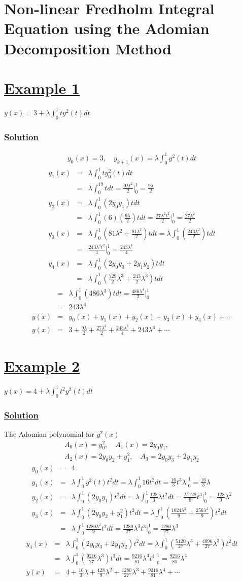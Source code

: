 \documentclass[11pt]{report}
\newcommand{\ubt}[1]{\textbf{\underline{#1}}}
\newcommand{\sps}{\\[0.2cm]}
\newcommand{\dsp}{\displaystyle}
\newcommand{\example}[1]{\section*{\ubt{Example #1}}}
\newcommand{\solution}{\subsubsection{\ubt{Solution}}}
\begin{document}
	\section{Non-linear Fredholm Integral Equation using the Adomian Decomposition Method}
	\example{1}
	$\dsp y(x) = 3 + \lambda\int_0^1 ty^2(t)dt$
	\solution
	\begin{eqnarray*}
		y_0(x) = 3,\quad y_{k+1}(x) = \lambda\int_0^1 y^2(t)dt
	\end{eqnarray*}
	\begin{eqnarray*}
		y_1(x)&=& \lambda\int_0^1 ty_0^2(t)dt\sps
		&=& \lambda\int_0^19t dt = \frac{9\lambda t^2}{2}\Bigg|_0^1 = \frac{9\lambda}{2}\sps
		y_2(x) &=& \lambda\int_0^1(2y_0y_1)tdt\sps
		&=& \lambda\int_0^1 (6)\left(\frac{9\lambda}{2}\right)tdt = \frac{27\lambda^2 t^2}{2}\Bigg|_0^1 = \frac{27\lambda^2}{2} \sps
		y_3(x) &=& \lambda\int_0^1\left(81\lambda^2 + \frac{81\lambda^2}{2}\right)t dt = \lambda\int_0^1\left(\frac{243\lambda^2}{2}\right)t dt\sps
		&=& \frac{243\lambda^3t^2}{4}\Bigg|_0^1 = \frac{243\lambda^3}{4}\sps
		y_4(x) &=& \lambda\int_0^1 (2y_0y_3 + 2y_1y_2)t dt\sps
		&=& \lambda\int_0^1\left(\frac{729}{2}\lambda^3 + \frac{243}{2}\lambda^3\right)t dt
	\end{eqnarray*}
	\begin{eqnarray*}
		&=&\lambda\int_0^1(486\lambda^3)t dt = \frac{486\lambda^4}{2}\Bigg|_0^1\sps
		&=& 243\lambda^4\sps
		y(x) &=& y_0(x) + y_1(x) + y_2(x) + y_3(x) + y_4(x) + \cdots\sps
		y(x) &=& 3 + \frac{9\lambda}{2} + \frac{27\lambda^2}{2} + \frac{243\lambda^3}{4} + 243\lambda^4 + \cdots
	\end{eqnarray*}

	\example{2}
	$\dsp y(x) = 4 + \lambda\int_0^1 t^2y^2(t)dt$
	\solution
	The Adomian polynomial for $y^2(x)$
	\begin{gather*}
		A_0(x) = y_0^2,\quad A_1(x)=2y_0y_1,\sps
		 A_2(x) =2y_0y_2 + y_1^2,\quad
		A_3 = 2y_0y_3 + 2y_1y_2
	\end{gather*}
	\begin{eqnarray*}
		y_0(x) &=& 4\sps
		y_1(x) &=& \lambda\int_0^1y^2(t)t^2dt = \lambda\int_0^1 16t^2 dt = \frac{16}{3}t^3\lambda\Bigg|_0^1 = \frac{16}{3}\lambda\sps
		y_2(x) &=& \lambda\int_0^1(2y_0y_1)t^2 dt = \lambda\int_0^1 \frac{128}{3}\lambda t^2 dt = \frac{\lambda^2 128}{9}t^3\Bigg|_0^1 = \frac{128}{9}\lambda^2\sps
		y_3 (x) &=& \lambda\int_0^1 (2y_0y_2 + y_1^2)t^2 dt = \lambda\int_0^1\left(\frac{1024\lambda^2}{9} + \frac{256\lambda^2}{9}\right)t^2 dt\sps
		&=& \lambda\int_0^1 \frac{1280\lambda^2}{9}t^2 dt = \frac{1280}{27}\lambda^3 t^3\Bigg|_0^1 = \frac{1280}{27}\lambda^3
	\end{eqnarray*}
	\begin{eqnarray*}
		y_4(x) &=& \lambda\int_0^1(2y_0y_3 + 2y_1y_2)t^2 dt = \lambda\int_0^1\left(\frac{5120}{27}\lambda^3 + \frac{4096}{27}\lambda^3\right)t^2 dt\sps
		&=& \lambda\int_0^1\left(\frac{9216}{27}\lambda^3\right)t^3 dt = \frac{9216}{81}\lambda^4 t^4\Bigg|_0^1 = \frac{9216}{81}\lambda^4\sps
		y(x) &=& 4 + \frac{16}{3}\lambda + \frac{128}{9}\lambda^2 + \frac{1280}{27}\lambda^3 + \frac{9216}{81}\lambda^4 + \cdots
	\end{eqnarray*}
	
\end{document}
